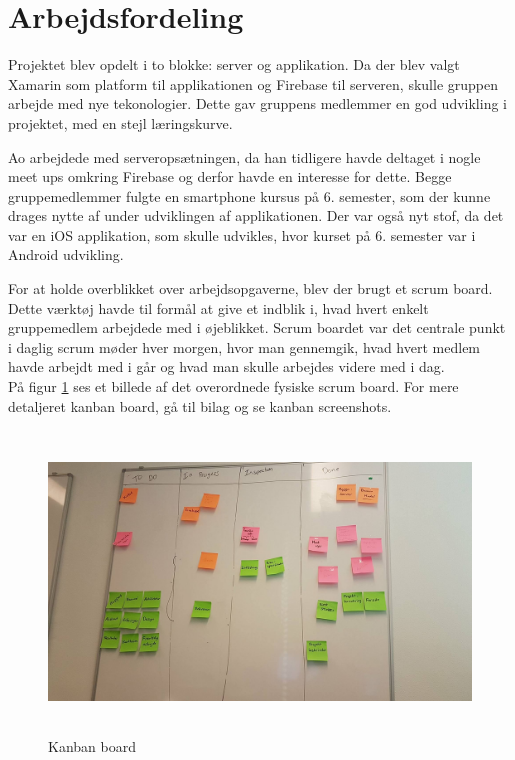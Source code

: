 \section{Arbejdsfordeling}
Projektet blev opdelt i to blokke: server og applikation. Da der blev valgt Xamarin som platform til applikationen og Firebase til serveren, skulle gruppen arbejde med nye tekonologier. Dette gav gruppens medlemmer en god udvikling i projektet, med en stejl læringskurve.

Ao arbejdede med serveropsætningen, da han tidligere havde deltaget i nogle meet ups omkring Firebase og derfor havde en interesse for dette. Begge gruppemedlemmer fulgte en smartphone kursus på 6. semester, som der kunne drages nytte af under udviklingen af applikationen. Der var også nyt stof, da det var en iOS applikation, som skulle udvikles, hvor kurset på 6. semester var i Android udvikling. 

For at holde overblikket over arbejdsopgaverne, blev der brugt et scrum board. Dette værktøj havde til formål at give et indblik i, hvad hvert enkelt gruppemedlem arbejdede med i øjeblikket. Scrum boardet var det centrale punkt i daglig scrum møder hver morgen, hvor man gennemgik, hvad hvert medlem havde arbejdt med i går og hvad man skulle arbejdes videre med i dag. \\
På figur \ref{fig:Kanbanboard} ses et billede af det overordnede fysiske scrum board. For mere detaljeret kanban board, gå til bilag og se kanban screenshots. \\

\begin{figure} [H]
	\begin{center}
		\includegraphics[height=8cm, width=12cm]{Arbejdsfordeling/ScrumBoard}
	\end{center}
	\caption{Kanban board}
	\label{fig:Kanbanboard}
\end{figure}

\clearpage